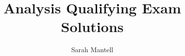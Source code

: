 \documentclass[
    letterpaper,
    fontsize=12pt,
    twoside=false,
    secnumdepth=1
]{kaonotes}
\begin{document}
    \title[Analysis Qualifying Exam Solutions]{Analysis Qualifying Exam Solutions}

    \author{Sarah Mantell}
    
    \frontmatter
    \maketitle

    \mainmatter
    
    
    
    
\end{document}
